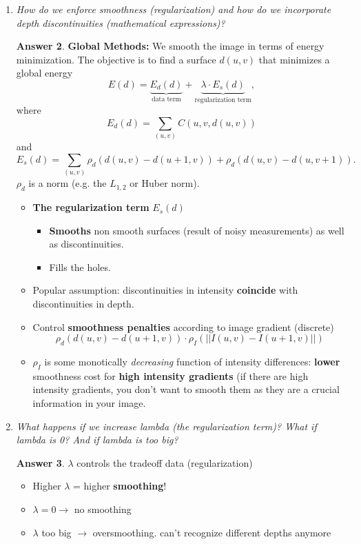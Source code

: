 \documentclass[a4paper,12 pt]{article}
\theoremstyle{definition}
\theoremstyle{remark}
\theoremstyle{definition}
\theoremstyle{definition}
\theoremstyle{definition}
\theoremstyle{definition}
\theoremstyle{remark}
\theoremstyle{remark}
\theoremstyle{definition}
\theoremstyle{definition}
\newtheorem*{answer}{Answer}
\begin{document}
\begin{enumerate}
\begin{answer}
\end{answer}
\item \textit{How do we enforce smoothness (regularization) and how do we incorporate depth discontinuities (mathematical expressions)? }
\begin{answer}
\textbf{Global Methods:} We smooth the image in terms of energy minimization. The objective is to find a surface $d(u,v)$ that minimizes a global energy
\begin{equation}
E(d)=\underbrace{E_d(d)}_{\text{data term}}+\underbrace{\lambda \cdot E_s(d)}_{\text{regularization term}},
\end{equation}
where 
\begin{equation}
E_d(d)=\sum_{(u,v)} C(u,v,d(u,v))
\end{equation}
and
\begin{equation}
E_s(d)=\sum_{(u,v)}\rho_d(d(u,v)-d(u+1,v))+\rho_d(d(u,v)-d(u,v+1)).
\end{equation}
$\rho_d$ is a norm (e.g. the $L_{1,2}$ or Huber norm). 
\end{answer}
\begin{itemize}
\item \textbf{The regularization term} $E_s(d)$
\begin{itemize}
\item \textbf{Smooths} non smooth surfaces (result of noisy measurements) as well as discontinuities.
\item Fills the holes.
\end{itemize}
\item Popular assumption: discontinuities in intensity \textbf{coincide} with discontinuities in depth.
\item Control \textbf{smoothness penalties} according to image gradient (discrete)
\begin{equation}
\rho_d(d(u,v)-d(u+1,v))\cdot \rho_I(||I(u,v)-I(u+1,v)||)
\end{equation}
\item $\rho_I$ is some monotically \textit{decreasing} function of intensity differences: \textbf{lower} smoothness cost for \textbf{high intensity gradients} (if there are high intensity gradients, you don't want to smooth them as they are a crucial information in your image.
\end{itemize}

\item \textit{What happens if we increase lambda (the regularization term)? What if lambda is 0? And if lambda is too big?}
\begin{answer}
$\lambda$ controls the tradeoff data (regularization) 
\begin{itemize}
\item Higher $\lambda$ =  higher \textbf{smoothing}!
\item $\lambda = 0 \rightarrow$  no smoothing
\item $\lambda$ too big $\rightarrow$ oversmoothing. can't recognize different depths anymore
\end{itemize}
 

\end{answer}
\end{enumerate}
\end{document}
